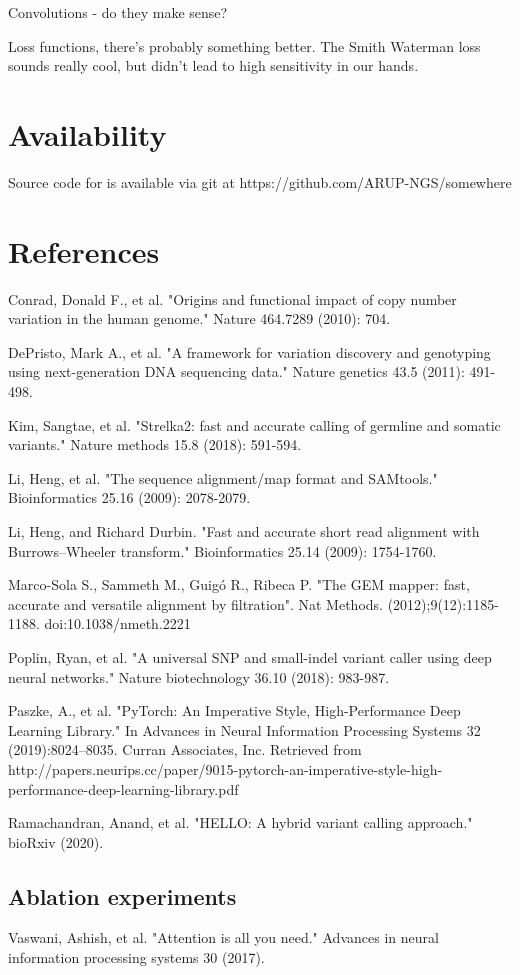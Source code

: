\documentclass[]{article}
\begin{document}
 Convolutions - do they make sense? 

 Loss functions, there's probably something better. The Smith Waterman loss sounds really cool, but didn't lead to high sensitivity in our hands. 
 
 \section{Availability}
 
 Source code for is available via git at https://github.com/ARUP-NGS/somewhere
 
 \section{References}
 
 \vspace{8pt}
 Conrad, Donald F., et al. "Origins and functional impact of copy number variation in the human genome." Nature 464.7289 (2010): 704.
 
\vspace{8pt}
DePristo, Mark A., et al. "A framework for variation discovery and genotyping using next-generation DNA sequencing data." Nature genetics 43.5 (2011): 491-498.


\vspace{8pt}
Kim, Sangtae, et al. "Strelka2: fast and accurate calling of germline and somatic variants." Nature methods 15.8 (2018): 591-594.

\vspace{8pt}
Li, Heng, et al. "The sequence alignment/map format and SAMtools." Bioinformatics 25.16 (2009): 2078-2079.

\vspace{8pt}
Li, Heng, and Richard Durbin. "Fast and accurate short read alignment with Burrows–Wheeler transform." Bioinformatics 25.14 (2009): 1754-1760.

\vspace{8pt}
Marco-Sola S., Sammeth M., Guigó R., Ribeca P. "The GEM mapper: fast, accurate and versatile alignment by filtration". Nat Methods. (2012);9(12):1185-1188. doi:10.1038/nmeth.2221

\vspace{8pt}
Poplin, Ryan, et al. "A universal SNP and small-indel variant caller using deep neural networks." Nature biotechnology 36.10 (2018): 983-987.
 
\vspace{8pt}
Paszke, A., et al. "PyTorch: An Imperative Style, High-Performance Deep Learning Library." In Advances in Neural Information Processing Systems 32 (2019):8024–8035. Curran Associates, Inc. Retrieved from http://papers.neurips.cc/paper/9015-pytorch-an-imperative-style-high-performance-deep-learning-library.pdf

\vspace{8pt}
Ramachandran, Anand, et al. "HELLO: A hybrid variant calling approach." bioRxiv (2020).
 

 \vspace{8pt}
 \subsection{Ablation experiments}
Vaswani, Ashish, et al. "Attention is all you need." Advances in neural information processing systems 30 (2017).
\end{document}
